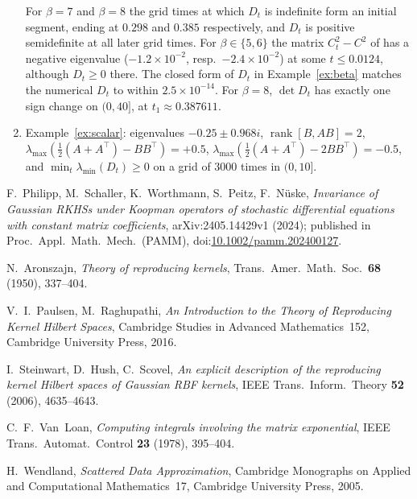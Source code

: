 \documentclass[11pt]{article}
\theoremstyle{definition}
\theoremstyle{remark}
\newcommand{\tp}{\top}
\begin{document}
\begin{enumerate}
For $\beta=7$ and $\beta=8$ the grid times at which $D_t$ is indefinite form an initial segment, ending at $0.298$
and $0.385$ respectively, and $D_t$ is positive semidefinite at all later grid times. For $\beta\in\{5,6\}$ the
matrix $C_t^2-C^2$ of \cite{PSWPN} has a negative eigenvalue ($-1.2\times10^{-2}$, resp.\ $-2.4\times10^{-2}$) at
some $t\le0.0124$, although $D_t\ge0$ there. The closed form of $D_t$ in Example~\ref{ex:beta} matches
the numerical $D_t$ to within $2.5\times10^{-14}$. For $\beta=8$, $\det D_t$ has exactly one sign change on $(0,40]$, at $t_1\approx0.387611$.
\item Example~\ref{ex:scalar}: eigenvalues $-0.25\pm0.968i$, $\operatorname{rank}[B,AB]=2$,
$\lambda_{\max}(\frac12(A+A^\tp)-BB^\tp)=+0.5$, $\lambda_{\max}(\frac12(A+A^\tp)-2BB^\tp)=-0.5$, and
$\min_t\lambda_{\min}(D_t)\ge0$ on a grid of $3000$ times in $(0,10]$.
\end{enumerate}

\begin{thebibliography}{9}

F.~Philipp, M.~Schaller, K.~Worthmann, S.~Peitz, F.~N\"uske,
\emph{Invariance of Gaussian RKHSs under Koopman operators of stochastic differential equations with constant matrix
coefficients}, arXiv:2405.14429v1 (2024); published in Proc.\ Appl.\ Math.\ Mech.\ (PAMM),
doi:\href{https://doi.org/10.1002/pamm.202400127}{10.1002/pamm.202400127}.

N.~Aronszajn, \emph{Theory of reproducing kernels}, Trans.\ Amer.\ Math.\ Soc.\ \textbf{68} (1950), 337--404.

V.~I.~Paulsen, M.~Raghupathi, \emph{An Introduction to the Theory of Reproducing Kernel Hilbert Spaces},
Cambridge Studies in Advanced Mathematics~152, Cambridge University Press, 2016.

I.~Steinwart, D.~Hush, C.~Scovel, \emph{An explicit description of the reproducing kernel Hilbert spaces of Gaussian
RBF kernels}, IEEE Trans.\ Inform.\ Theory \textbf{52} (2006), 4635--4643.

C.~F.~Van~Loan, \emph{Computing integrals involving the matrix exponential}, IEEE Trans.\ Automat.\ Control
\textbf{23} (1978), 395--404.

H.~Wendland, \emph{Scattered Data Approximation}, Cambridge Monographs on Applied and Computational Mathematics~17,
Cambridge University Press, 2005.

\end{thebibliography}
\end{document}
